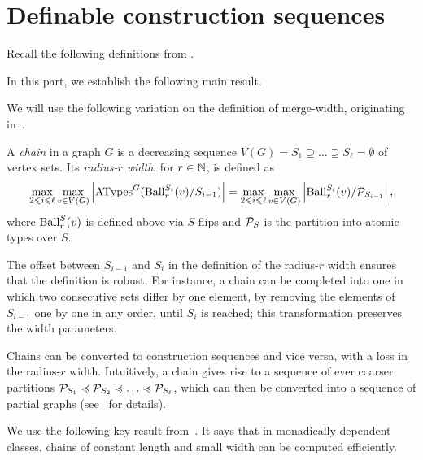 \part{Definable construction sequences}\label{part:definable-construction-sequences}

Recall the following definitions from .


In this part, we establish the following main result.
\thmskeldefseq*


We will use the following variation on the definition of merge-width, originating in~\cite{drabik2026variants}.


\begin{definition}\label{def:chain-width}
  A \emph{chain} in a graph $G$ is a decreasing sequence $V(G)=S_1\supseteq\dots\supseteq S_\ell=\emptyset$ of vertex sets. Its \emph{radius-$r$ width}, for $r\in\mathbb N$, is defined as
$$\max_{2\leqslant i\leqslant \ell} \max_{v\in V(G)}\left|\mathrm{ATypes}^G(\operatorname{Ball}_r^{S_{i}}(v)/S_{i-1})\right|=\max_{2\leqslant i\leqslant \ell} \max_{v\in V(G)}\left|\operatorname{Ball}_r^{S_{i}}(v)/\mathcal P_{S_{i-1}}\right|,$$
where $\operatorname{Ball}_r^S(v)$ is defined above via $S$-flips and $\mathcal P_{S}$ is the partition into atomic types over $S$.
\end{definition}



The offset between $S_{i-1}$ and $S_i$ in the definition of the radius-$r$ width ensures that the definition is robust. For instance, a chain can be completed into one in which two consecutive sets differ by one element, 
by removing the elements of $S_{i-1}$ one by one in any order, until $S_i$ is reached; this transformation
preserves the width parameters.

Chains can be converted to construction sequences and vice versa, with a loss in the radius-$r$ width.
Intuitively, a chain 
gives rise to a sequence of ever coarser partitions $\PP_{S_1}\preceq \PP_{S_2}\preceq\dots \preceq \PP_{S_\ell}$, which can then be converted 
into a sequence of partial graphs
(see~\cite{drabik2026variants} for details).


We use the following key result from~\cite{md-abmw}. It says that in monadically dependent classes, chains of constant length and small width can be computed efficiently.


